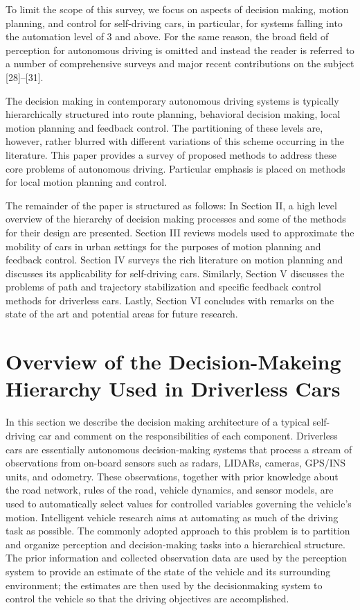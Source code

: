 To limit the scope of this survey, we focus on aspects of decision making, motion planning, and control for self-driving cars, in particular, for systems falling into the automation level of 3 and above. For the same reason, the broad field of perception for autonomous driving is omitted and instead the reader is referred to a number of comprehensive surveys and major recent contributions on the subject [28]–[31].

The decision making in contemporary autonomous driving systems is typically hierarchically structured into route planning, behavioral decision making, local motion planning and feedback control. The partitioning of these levels are, however, rather blurred with different variations of this scheme occurring in the literature. This paper provides a survey of proposed methods to address these core problems of autonomous driving. Particular emphasis is placed on methods for local motion planning and control.

The remainder of the paper is structured as follows: In Section II, a high level overview of the hierarchy of decision making processes and some of the methods for their design are presented. Section III reviews models used to approximate the mobility of cars in urban settings for the purposes of motion planning and feedback control. Section IV surveys the rich literature on motion planning and discusses its applicability for self-driving cars. Similarly, Section V discusses the problems of path and trajectory stabilization and specific feedback control methods for driverless cars. Lastly, Section VI concludes with remarks on the state of the art and potential areas for future research.

\section{Overview of the Decision-Makeing Hierarchy Used in Driverless Cars}

In this section we describe the decision making architecture of a typical self-driving car and comment on the responsibilities of each component. Driverless cars are essentially autonomous decision-making systems that process a stream of observations from on-board sensors such as radars, LIDARs, cameras, GPS/INS units, and odometry. These observations, together with prior knowledge about the road network, rules of the road, vehicle dynamics, and sensor models, are used to automatically select values for controlled variables governing the vehicle’s motion. Intelligent vehicle research aims at automating as much of the driving task as possible. The commonly adopted approach to this problem is to partition and organize perception and decision-making tasks into a hierarchical structure. The prior information and collected observation data are used by the perception system to provide an estimate of the state of the vehicle and its surrounding environment; the estimates are then used by the decisionmaking system to control the vehicle so that the driving objectives are accomplished.

